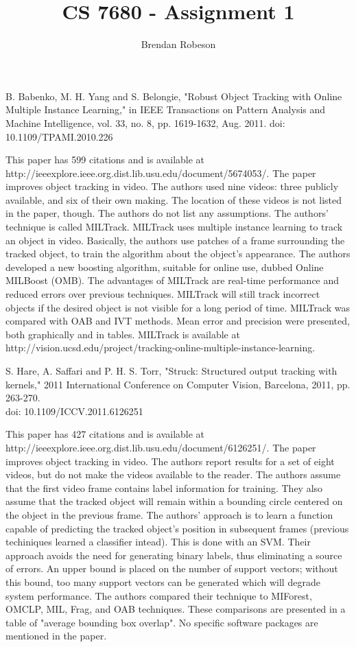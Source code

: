 \documentclass[11pt]{article}
\begin{document}
\title{CS 7680 - Assignment 1}
\author{Brendan Robeson}
\maketitle

B. Babenko, M. H. Yang and S. Belongie, "Robust Object Tracking with Online Multiple Instance Learning," in IEEE Transactions on Pattern Analysis and Machine Intelligence, vol. 33, no. 8, pp. 1619-1632, Aug. 2011. doi: 10.1109/TPAMI.2010.226

This paper has 599 citations and is available at \\ http://ieeexplore.ieee.org.dist.lib.usu.edu/document/5674053/. The paper improves object tracking in video. The authors used nine videos: three publicly available, and six of their own making. The location of these videos is not listed in the paper, though. The authors do not list any assumptions. The authors' technique is called MILTrack. MILTrack uses multiple instance learning to track an object in video. Basically, the authors use patches of a frame surrounding the tracked object, to train the algorithm about the object's appearance. The authors developed a new boosting algorithm, suitable for online use, dubbed Online MILBoost (OMB). The advantages of MILTrack are real-time performance and reduced errors over previous techniques. MILTrack will still track incorrect objects if the desired object is not visible for a long period of time. MILTrack was compared with OAB and IVT methods. Mean error and precision were presented, both graphically and in tables. MILTrack is available at http://vision.ucsd.edu/project/tracking-online-multiple-instance-learning.

S. Hare, A. Saffari and P. H. S. Torr, "Struck: Structured output tracking with kernels," 2011 International Conference on Computer Vision, Barcelona, 2011, pp. 263-270. \\ doi: 10.1109/ICCV.2011.6126251

This paper has 427 citations and is available at \\ http://ieeexplore.ieee.org.dist.lib.usu.edu/document/6126251/. The paper improves object tracking in video. The authors report results for a set of eight videos, but do not make the videos available to the reader. The authors assume that the first video frame contains label information for training. They also assume that the tracked object will remain within a bounding circle centered on the object in the previous frame. The authors' approach is to learn a function capable of predicting the tracked object's position in subsequent frames (previous techiniques learned a classifier intead). This is done with an SVM. Their approach avoids the need for generating binary labels, thus eliminating a source of errors. An upper bound is placed on the number of support vectors; without this bound, too many support vectors can be generated which will degrade system performance. The authors compared their technique to MIForest, OMCLP, MIL, Frag, and OAB techniques. These comparisons are presented in a table of "average bounding box overlap". No specific software packages are mentioned in the paper.
\end{document}
